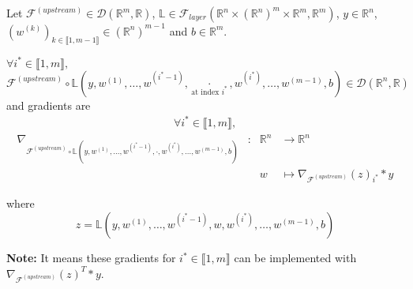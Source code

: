 \documentclass[11pt,en]{elegantpaper}
\newcommand{\Real}{\mathbb{R}}
\begin{document}
\begin{proposition}
  {\normalfont
    Let $\mathcal{F}^{(upstream)} \in \mathcal{D}(\Real^m,\Real)$,
      $\mathbb{L} \in \mathcal{F}_{layer}(\Real^n \times (\Real^n)^m \times \Real^m,\Real^m)$,
      $y \in \Real^n$, $(w^{(k)})_{k \in \llbracket 1,m-1 \rrbracket} \in (\Real^n)^{m-1}$ and $b \in \Real^m$. \par
    $\forall i^* \in \llbracket 1,m \rrbracket,$
    $\mathcal{F}^{(upstream)} \circ \mathbb{L}(y,w^{(1)},\ldots,w^{(i^*-1)},\underset{\text{at index $i^*$}}{\cdot},w^{(i^*)},\ldots,w^{(m-1)},b) \in \mathcal{D}(\Real^n, \Real)$
    and gradients are \begin{equation*}
      \begin{gathered}
        \forall i^* \in \llbracket 1,m \rrbracket,
      \end{gathered}
    \end{equation*}
    \begin{equation} \label{prop:densel_W_simplified_differential}
      \begin{array}{llll}
        \nabla_{\mathcal{F}^{(upstream)} \circ \mathbb{L}(y,w^{(1)},\ldots,w^{(i^*-1)},\cdot,w^{(i^*)},\ldots,w^{(m-1)},b)} & : & \Real^n  & \longrightarrow \Real^n \\
        &  & w & \longmapsto \nabla_{\mathcal{F}^{(upstream)}}(z)_{i^*} * y
      \end{array}
    \end{equation} \par
    where \begin{equation*}
      z = \mathbb{L}(y,w^{(1)},\ldots,w^{(i^*-1)},w,w^{(i^*)},\ldots,w^{(m-1)},b)
    \end{equation*}

    \textbf{Note:} It means these gradients for $i^* \in \llbracket 1,m \rrbracket$ can be implemented with $\nabla_{\mathcal{F}^{(upstream)}}(z)^T * y$.
  }
\end{proposition}
\end{document}

